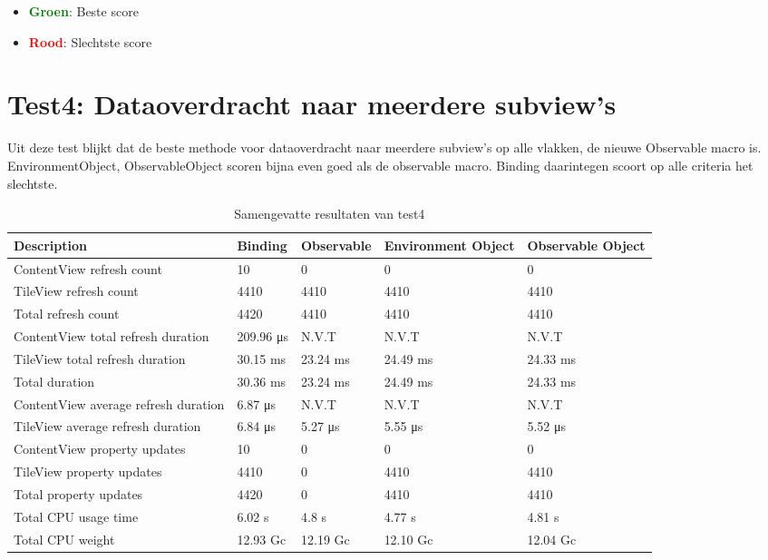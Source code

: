 \begin{itemize}
    \item \textcolor{green}{\textbf{Groen}}: Beste score
    \item \textcolor{red}{\textbf{Rood}}: Slechtste score
\end{itemize}
\section{Test4: Dataoverdracht naar meerdere subview's}
Uit deze test blijkt dat de beste methode voor dataoverdracht naar meerdere subview's op alle vlakken, de nieuwe Observable macro is. EnvironmentObject, ObservableObject scoren bijna even goed als de observable macro. Binding daarintegen scoort op alle criteria het slechtste.
\begin{table}[H]
    \centering
    \begin{tabularx}{\textwidth}{|>{\raggedright\arraybackslash}m{5cm}|X|X|X|X|}
        \hline
        \textbf{Description} & \textbf{Binding} & \textbf{Observable} & \textbf{Environment Object} & \textbf{Observable Object} \\
        \hline
         ContentView refresh count & 10 & 0 & 0 & 0 \\
        \hline
         TileView refresh count & 4410 & 4410 & 4410 & 4410 \\
        \hline
        Total refresh count & \cellcolor{red!50} 4420 & \cellcolor{green!50}4410 & \cellcolor{green!50}4410 & \cellcolor{green!50}4410 \\
        \hline
         ContentView total refresh duration & 209.96 μs & N.V.T & N.V.T & N.V.T \\
        \hline
        TileView total refresh duration & 30.15 ms & 23.24 ms & 24.49 ms & 24.33 ms \\
        \hline
        Total duration &  \cellcolor{red!50}30.36 ms & \cellcolor{green!50}23.24 ms & \cellcolor{green!50}24.49 ms & \cellcolor{green!50}24.33 ms \\
        \hline
        ContentView average refresh duration & 6.87 μs & N.V.T & N.V.T & N.V.T \\
        \hline
        TileView average refresh duration & 6.84 μs & 5.27 μs & 5.55 μs & 5.52 μs \\
        \hline
         ContentView property updates & 10 & 0 & 0 & 0 \\
        \hline
        TileView property updates & 4410 & 0 & 4410 & 4410 \\
        \hline
        Total property updates & \cellcolor{red!50} 4420 & \cellcolor{green!50}0 & 4410 & 4410 \\
        \hline
        Total CPU usage time & \cellcolor{red!50} 6.02 s & \cellcolor{green!50}4.8 s & \cellcolor{green!50}4.77 s & \cellcolor{green!50}4.81 s \\
        \hline
        Total CPU weight & \cellcolor{red!50} 12.93 Gc & \cellcolor{green!50}12.19 Gc & \cellcolor{green!50}12.10 Gc & \cellcolor{green!50}12.04 Gc \\
        \hline
    \end{tabularx}
    \caption{Samengevatte resultaten van test4}
    \label{table:summary3}
\end{table}